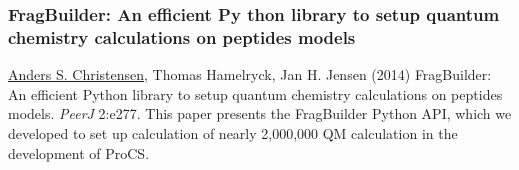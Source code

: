\subsubsection{FragBuilder: An efficient Py    thon library to setup quantum chemistry calculations on peptides models}
\underline{Anders S. Christensen}, Thomas Hamelryck, Jan H. Jensen (2014) FragBuilder: An efficient Python library to setup quantum chemistry calculations on peptides models. \textit{PeerJ} 2:e277.
This paper presents the FragBuilder Python API, which we developed to set up calculation of nearly 2,000,000 QM calculation in the development of ProCS.



